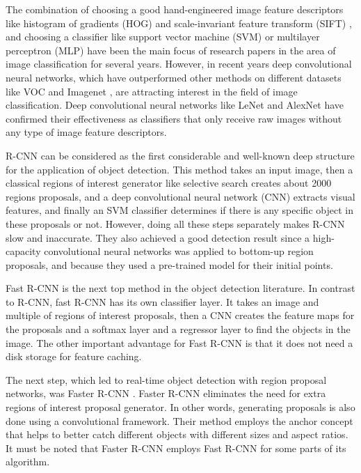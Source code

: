 \documentclass[conference]{IEEEtran}
\begin{document}
The combination of choosing a good hand-engineered image feature descriptors like histogram of gradients (HOG) \cite{hog} and scale-invariant feature transform (SIFT) \cite{sift}, and choosing a classifier like support vector machine (SVM) \cite{svm} or multilayer perceptron (MLP) have been the main focus of research papers in the area of image classification for several years. However, in recent years deep convolutional neural networks, which have outperformed other methods on different datasets like VOC \cite{voc} and Imagenet \cite{imagenet}, are attracting interest in the field of image classification. Deep convolutional neural networks like LeNet \cite{lenet} and AlexNet \cite{alex} have confirmed their effectiveness as classifiers that only receive raw images without any type of image feature descriptors.

R-CNN \cite{RCNN} can be considered as the first considerable and well-known deep structure for the application of object detection. This method takes an input image, then a classical regions of interest generator like selective search \cite{selective} creates about 2000 regions proposals, and a deep convolutional neural network (CNN) extracts visual features, and finally an SVM classifier determines if there is any specific object in these proposals or not. However, doing all these steps separately makes R-CNN slow and inaccurate. They also achieved a good detection result since a high-capacity convolutional neural networks was applied to bottom-up region proposals, and because they used a pre-trained model for their initial points.

Fast R-CNN \cite{fastrcnn} is the next top method in the object detection literature. In contrast to R-CNN, fast R-CNN has its own classifier layer. It takes an image and multiple of regions of interest proposals, then a CNN creates the feature maps for the proposals and a softmax layer and a regressor layer to find the objects in the image. The other important advantage for Fast R-CNN is that it does not need a disk storage for feature caching. 

The next step, which led to real-time object detection with region proposal networks, was Faster R-CNN \cite{faster}. Faster R-CNN eliminates the need for extra regions of interest proposal generator. In other words, generating proposals is also done using a convolutional framework. Their method employs the anchor concept that helps to better catch different objects with different sizes and aspect ratios. It must be noted that Faster R-CNN employs Fast R-CNN for some parts of its algorithm. 
\end{document}

